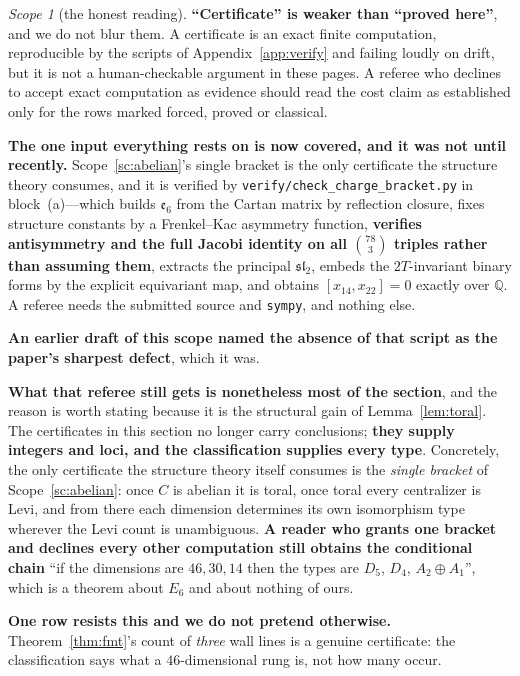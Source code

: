 \documentclass[11pt,reqno]{amsart}
\theoremstyle{plain}
\theoremstyle{definition}
\theoremstyle{remark}
\newtheorem{scope}[theorem]{Scope}
\newcommand{\Q}{\mathbb{Q}}
\newcommand{\sll}{\mathfrak{sl}}
\newcommand{\ee}{\mathfrak{e}}
\newcommand{\fn}[1]{\texttt{\small #1}}
\begin{document}
\begin{scope}[the honest reading]\label{sc:audit}
\textbf{``Certificate'' is weaker than ``proved here''}, and we do not blur them. A
certificate is an exact finite computation, reproducible by the scripts of
Appendix~\ref{app:verify} and failing loudly on drift, but it is not a human-checkable
argument in these pages. A referee who declines to accept exact computation as evidence
should read the cost claim as established only for the rows marked forced, proved or
classical.

\textbf{The one input everything rests on is now covered, and it was not until
recently.} Scope~\ref{sc:abelian}'s single bracket is the only certificate the structure
theory consumes, and it is verified by \fn{verify/check\_\allowbreak charge\_\allowbreak bracket.py} in
block~(a)---which builds $\ee_6$ from the Cartan matrix by reflection closure, fixes
structure constants by a Frenkel--Kac asymmetry function, \textbf{verifies antisymmetry
and the full Jacobi identity on all $\binom{78}{3}$ triples rather than assuming them},
extracts the principal $\sll_2$, embeds the $2T$-invariant binary forms by the explicit
equivariant map, and obtains $[x_{14},x_{22}]=0$ exactly over $\Q$. A referee needs the
submitted source and \texttt{sympy}, and nothing else.

\textbf{An earlier draft of this scope named the absence of that script as the paper's
sharpest defect}, which it was.

\textbf{What that referee still gets is nonetheless most of the section}, and the reason
is worth stating because it is the structural gain of Lemma~\ref{lem:toral}. The
certificates in this section no longer carry conclusions; \textbf{they supply integers
and loci, and the classification supplies every type}. Concretely, the only certificate
the structure theory itself consumes is the \emph{single bracket} of
Scope~\ref{sc:abelian}: once $C$ is abelian it is toral, once toral every centralizer is
Levi, and from there each dimension determines its own isomorphism type wherever the
Levi count is unambiguous. \textbf{A reader who grants one bracket and declines every
other computation still obtains the conditional chain} ``if the dimensions are
$46,30,14$ then the types are $D_5$, $D_4$, $A_2{\oplus}A_1$'', which is a theorem about
$E_6$ and about nothing of ours.

\textbf{One row resists this and we do not pretend otherwise.}
Theorem~\ref{thm:fmt}'s count of \emph{three} wall lines is a genuine certificate: the
classification says what a $46$-dimensional rung is, not how many occur.
\end{scope}
\end{document}
